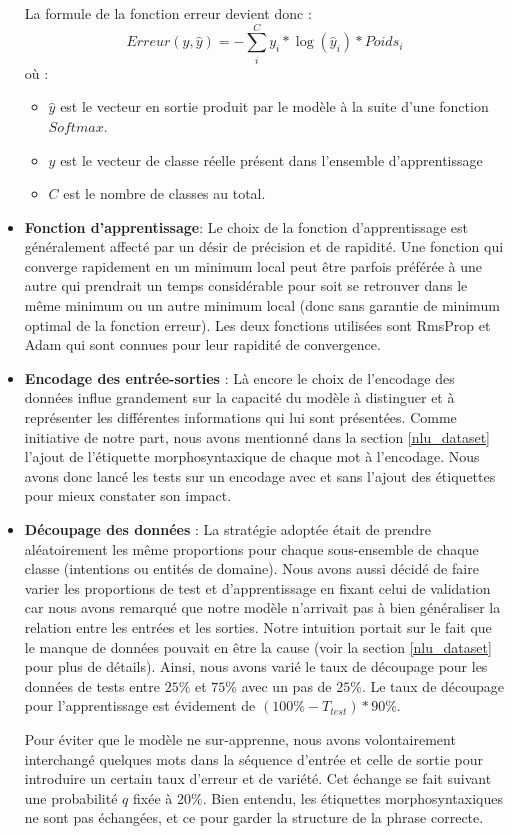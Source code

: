 \begin{itemize}
		La formule de la fonction erreur devient donc : 
		\begin{equation*}
			Erreur(y,\hat{y}) = - \sum_{i}^{C} y_i * \log(\hat{y}_i) * Poids_i 
		\end{equation*}
		où : 
		\begin{itemize}
			\item $\hat{y}$ est le vecteur en sortie produit par le modèle à la suite d'une fonction $Softmax$.
			\item $y$ est le vecteur de classe réelle présent dans l'ensemble d'apprentissage
			\item $C$ est le nombre de classes au total.
		\end{itemize}
	
		\item \textbf{Fonction d'apprentissage}:
		Le choix de la fonction d'apprentissage est généralement affecté par un désir de précision et de rapidité. Une fonction qui converge rapidement en un minimum local peut être parfois préférée à une autre qui prendrait un temps considérable pour soit se retrouver dans le même minimum ou un autre minimum local (donc sans garantie de minimum optimal de la fonction erreur). Les deux fonctions utilisées sont RmsProp et Adam qui sont connues pour leur rapidité de convergence.
		
		\item \textbf{Encodage des entrée-sorties} :
		Là encore le choix de l'encodage des données influe grandement sur la capacité du modèle à distinguer et à représenter les différentes informations qui lui sont présentées. Comme initiative de notre part, nous avons mentionné dans la section \ref{nlu_dataset} l'ajout de l'étiquette morphosyntaxique de chaque mot à l'encodage. Nous avons donc lancé les tests sur un encodage avec et sans l'ajout des étiquettes pour mieux constater son impact.
		
		\item \textbf{Découpage des données} :
		La stratégie adoptée était de prendre aléatoirement les même proportions pour chaque sous-ensemble de chaque classe (intentions ou entités de domaine). Nous avons aussi décidé de faire varier les proportions de test et d'apprentissage en fixant celui de validation car nous avons remarqué que notre modèle n'arrivait pas à bien généraliser la relation entre les entrées et les sorties. Notre intuition portait sur le fait que le manque de données pouvait en être la cause (voir la section \ref{nlu_dataset} pour plus de détails). Ainsi, nous avons varié le taux de découpage pour les données de tests entre $25\%$ et $75\%$ avec un pas de $25\%$. Le taux de découpage pour l'apprentissage est évidement de $(100\%-T_{test})*90\%$.
		\par
		Pour éviter que le modèle ne sur-apprenne, nous avons volontairement interchangé quelques mots dans la séquence d'entrée et celle de sortie pour introduire un certain taux d'erreur et de variété. Cet échange se fait suivant une probabilité $q$ fixée à $20\%$. Bien entendu, les étiquettes morphosyntaxiques ne sont pas échangées, et ce pour garder la structure de la phrase correcte.
	\end{itemize}
